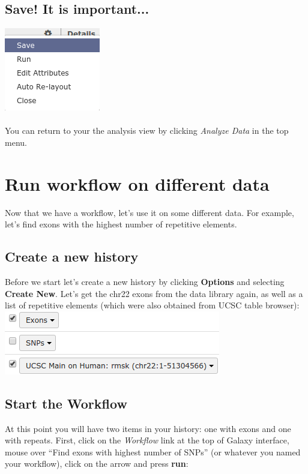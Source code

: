 \documentclass[11pt,a4paper]{article}
\begin{document}
\subsection{Save! It is important...}

\includegraphics[scale=0.55]{figures/101_35}\\
\ \\
You can return to your the analysis view by clicking \textit{Analyze Data} in the top menu.
\section{Run workflow on different data}
Now that we have a workflow, let's use it on some different data. For example, let's find exons with the highest number of repetitive elements.
\subsection{Create a new history}
Before we start let's create a new history by clicking \textbf{Options} and selecting \textbf{Create New}. Let's get the chr22 exons from the data library again, as well as a list of repetitive elements (which were
also obtained from UCSC table browser):\\

\includegraphics[scale=0.55]{figures/101_36}
\subsection{Start the Workflow}
At this point you will have two items in your history: one with exons and one with repeats. First, click on the \textit{Workflow} link at the top of Galaxy interface, mouse over ``Find exons with highest number of SNPs'' (or whatever you named your workflow), click on the arrow and press \textbf{run}:
\end{document}
